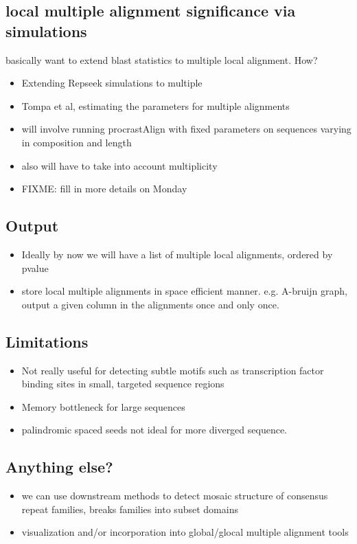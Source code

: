 \documentclass{llncs}
\begin{document}
\subsection{local multiple alignment significance via simulations}
basically want to extend blast statistics to multiple local alignment. How?
\begin{itemize}
\item Extending Repseek simulations to multiple
\item Tompa et al, estimating the parameters for multiple alignments
\item will involve running procrastAlign with fixed parameters on sequences varying in composition and length
\item also will have to take into account multiplicity
\item FIXME: fill in more details on Monday
\end{itemize}

\subsection{Output}
\begin{itemize}
\item Ideally by now we will have a list of multiple local alignments, ordered by pvalue
\item store local multiple alignments in space efficient manner. e.g. A-bruijn graph, output a given column in the alignments once and only once.
\end{itemize}
\subsection{Limitations}
\begin{itemize}
\item Not really useful for detecting subtle motifs such as transcription factor
binding sites in small, targeted sequence regions
\item Memory bottleneck for large sequences
\item palindromic spaced seeds not ideal for more diverged sequence. 
\end{itemize}
\subsection{Anything else?}
\begin{itemize}
\item we can use downstream methods to detect mosaic structure of consensus repeat families, breaks
    families into subset domains
    
\item visualization and/or incorporation into global/glocal multiple alignment tools 
\end{itemize}
\end{document}
